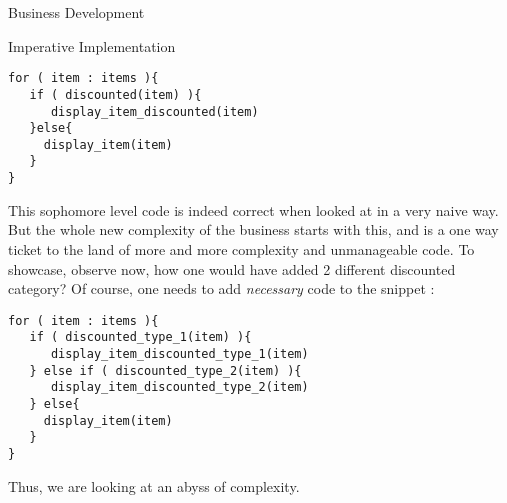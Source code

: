 \begin{section}{Business Development}
\begin{subsection}{Imperative Implementation}
\begin{center}\begin{minipage}{\linewidth}
\begin{lstlisting}[style=JexlStyle]
for ( item : items ){
   if ( discounted(item) ){
      display_item_discounted(item)
   }else{
     display_item(item)
   }
}
\end{lstlisting}
\end{minipage}\end{center}

This sophomore level code is indeed correct when looked at in a very naive way.
But the whole new complexity of the business starts with this, and is a one way ticket to the land of more and more complexity and unmanageable code. To showcase, observe now, how one would have added 2 different discounted category? Of course, one needs to add \emph{necessary} code to the snippet :

\begin{lstlisting}[style=JexlStyle]
for ( item : items ){
   if ( discounted_type_1(item) ){
      display_item_discounted_type_1(item)
   } else if ( discounted_type_2(item) ){
      display_item_discounted_type_2(item)
   } else{
     display_item(item)
   }
}
\end{lstlisting}

Thus, we are looking at an abyss of complexity. 
\end{subsection}

\end{section}

